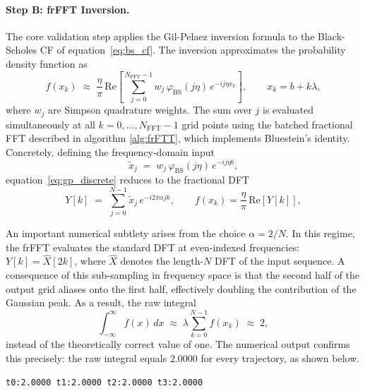 \paragraph{Step B: frFFT Inversion.}
The core validation step applies the Gil-Pelaez inversion formula to the
Black-Scholes CF of equation~\eqref{eq:bs_cf}.  The inversion approximates
the probability density function as
\begin{equation}
    f(x_k) \;\approx\;
    \frac{\eta}{\pi}\,
    \mathrm{Re}\!\left[
        \sum_{j=0}^{N_{\mathrm{FFT}}-1}
        w_j\,\varphi_{\mathrm{BS}}(j\eta)\,e^{-ij\eta x_k}
    \right],
    \qquad x_k = b + k\lambda,
    \label{eq:gp_discrete}
\end{equation}
where $w_j$ are Simpson quadrature weights.  The sum over $j$ is evaluated
simultaneously at all $k = 0, \ldots, N_{\mathrm{FFT}} - 1$ grid points
using the batched fractional FFT described in algorithm \ref{alg:frFTT},
which implements Bluestein's identity.  Concretely, defining the frequency-domain
input
\begin{equation}
    \tilde{x}_j \;=\; w_j\,\varphi_{\mathrm{BS}}(j\eta)\,e^{-ij\eta b},
    \label{eq:fft_input}
\end{equation}
equation~\eqref{eq:gp_discrete} reduces to the fractional DFT
\begin{equation}
    Y[k] \;=\;
    \sum_{j=0}^{N-1} \tilde{x}_j\,e^{-i2\pi\alpha jk},
    \qquad
    f(x_k) = \frac{\eta}{\pi}\,\mathrm{Re}[Y[k]],
    \label{eq:frfft_sum}
\end{equation}

An important numerical subtlety arises from the choice $\alpha = 2/N$.
In this regime, the frFFT evaluates the standard DFT at even-indexed
frequencies: $Y[k] = \hat{X}[2k]$, where $\hat{X}$ denotes the length-$N$
DFT of the input sequence.  A consequence of this sub-sampling in frequency
space is that the second half of the output grid aliases onto the first half,
effectively doubling the contribution of the Gaussian peak.  As a result, the
raw integral
\begin{equation}
    \int_{-\infty}^{\infty} f(x)\,dx
    \;\approx\;
    \lambda \sum_{k=0}^{N-1} f(x_k)
    \;\approx\; 2,
    \label{eq:raw_integral}
\end{equation}
instead of the theoretically correct value of one.  The numerical output
confirms this precisely: the raw integral equals $2.0000$ for every
trajectory, as shown below.

\begin{center}
\texttt{t0:2.0000 \quad t1:2.0000 \quad t2:2.0000 \quad t3:2.0000}
\end{center}

